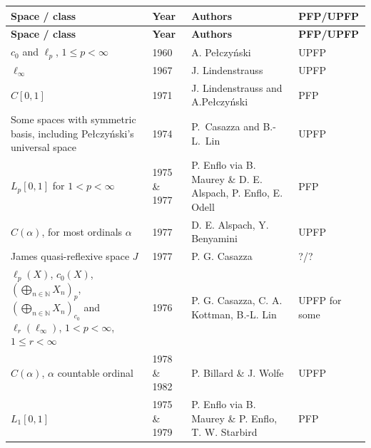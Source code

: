 \documentclass[11pt]{amsart}
\theoremstyle{plain}
\theoremstyle{definition}
\numberwithin{equation}{section}
\newcommand{\N}{\mathbb{N}}
\renewcommand{\le}{\leqslant}
\renewcommand{\leq}{\leqslant}
\begin{document}
\begin{longtable}{@{}L{0.30\textwidth}L{0.08\textwidth}L{0.29\textwidth}L{0.23\textwidth}@{}}
\toprule
\textbf{Space / class} & \textbf{Year} & \textbf{Authors} & \textbf{PFP/UPFP} \\
\midrule
\endfirsthead

\toprule
\textbf{Space / class} & \textbf{Year} & \textbf{Authors} & \textbf{PFP/UPFP} \\
\midrule
\endhead


$c_0$ and $\ell_p$, $1 \leq p < \infty$ & 1960 &
A. Pe\l czy\'nski \cite{Pelczynski1960} & UPFP \\

$\ell_\infty$ & 1967 &
J. Lindenstrauss \cite{Lin1967} & UPFP \\

$C[0,1]$ & 1971 &
J. Lindenstrauss and A.Pe\l czy\'nski \cite{LindenstraussPelczynski1971} & PFP \\

Some spaces with symmetric basis, including Pe{\l}czy\'nski’s universal space & 1974 &
P.~Casazza and B.-L.~Lin \cite{CasazzaLin1974} & UPFP \\


$L_p[0,1]$ for $1<p<\infty$ & 1975 \& 1977 &
P. Enflo via B. Maurey \cite{Maurey1975} \& D. E. Alspach, P. Enflo, E. Odell \cite{AEO1977} & PFP \\

$C(\alpha)$, for most ordinals $\alpha$ & 1977 &
D. E. Alspach, Y. Benyamini \cite{AlspachBenyamini1977} & UPFP \\

James quasi-reflexive space $J$ & 1977 &
P. G. Casazza \cite{Casazza1977} & ?/? \\

$\ell_p(X)$, $c_0(X)$, $\left(\bigoplus_{n \in \N} X_n \right)_p$,
$\left(\bigoplus_{n \in \N} X_n \right)_{c_0}$ and
$\ell_r(\ell_\infty)$, \mbox{\ensuremath{1 < p < \infty}}, $1 \le r < \infty$ & 1976 &
P. G. Casazza, C. A. Kottman, B.-L. Lin \cite{CKL1976, CKL1977} & UPFP for some \\

$C(\alpha)$, $\alpha$ countable ordinal & 1978 \& 1982 &
P. Billard \cite{Billard1978} \& J. Wolfe \cite{Wolfe1982} & UPFP \\

$L_1[0,1]$ & 1975 \& 1979 &
P. Enflo via B. Maurey \cite{Maurey1975} \& P. Enflo, T. W. Starbird \cite{ES1979} & PFP \\


\end{longtable}
\end{document}
